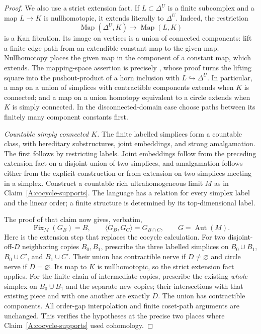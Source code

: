 \begin{proof}
We also use a strict extension fact. If $L\subset\Delta^U$ is a finite subcomplex and a map $L\to K$ is nullhomotopic, it extends literally to $\Delta^U$. Indeed, the restriction
\[
 \operatorname{Map}(\Delta^U,K)\longrightarrow\operatorname{Map}(L,K)
\]
is a Kan fibration. Its image on vertices is a union of connected components: lift a finite edge path from an extendible constant map to the given map. Nullhomotopy places the given map in the component of a constant map, which extends. The mapping-space assertion is precisely \cite[Proposition I.5.2 and Corollary I.5.3(2)]{GoerssJardine1999}, whose proof turns the lifting square into the pushout-product of a horn inclusion with $L\hookrightarrow\Delta^U$. In particular, a map on a union of simplices with contractible components extends when $K$ is connected; and a map on a union homotopy equivalent to a circle extends when $K$ is simply connected. In the disconnected-domain case choose paths between its finitely many component constants first.

\emph{Countable simply connected $K$.}
The finite labelled simplices form a countable class, with hereditary substructures, joint embeddings, and strong amalgamation. The first follows by restricting labels. Joint embeddings follow from the preceding extension fact on a disjoint union of two simplices, and amalgamation follows either from the explicit construction or from extension on two simplices meeting in a simplex. Construct a countable rich ultrahomogeneous limit $M$ as in Claim~\ref{A:cocycle-supports}. The language has a relation for every simplex label and the linear order; a finite structure is determined by its top-dimensional label.

The proof of that claim now gives, verbatim,
\[
 \operatorname{Fix}_M(G_B)=B,\qquad
 \langle G_B,G_C\rangle=G_{B\cap C},
 \qquad G=\operatorname{Aut}(M).
\]
Here is the extension step that replaces the cocycle calculation. For two disjoint-off-$D$ neighboring copies $B_0,B_1$, prescribe the three labelled simplices on $B_0\cup B_1$, $B_0\cup C'$, and $B_1\cup C'$. Their union has contractible nerve if $D\ne\varnothing$ and circle nerve if $D=\varnothing$. Its map to $K$ is nullhomotopic, so the strict extension fact applies. For the finite chain of intermediate copies, prescribe the existing \emph{whole} simplex on $B_0\cup B_1$ and the separate new copies; their intersections with that existing piece and with one another are exactly $D$. The union has contractible components. All order-gap interpolation and finite coset-path arguments are unchanged. This verifies the hypotheses at the precise two places where Claim~\ref{A:cocycle-supports} used cohomology.


\end{proof}

